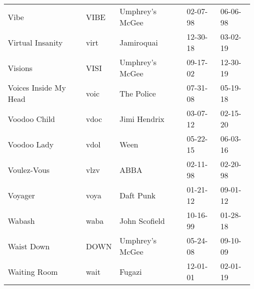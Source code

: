 \begin{longtable}{p{}p{}p{}p{}p{}}
                                                                    Vibe &          VIBE &                                          Umphrey's McGee &              02-07-98 &             06-06-98 \\
                                                        Virtual Insanity &          virt &                                               Jamiroquai &              12-30-18 &             03-02-19 \\
                                                                 Visions &          VISI &                                          Umphrey's McGee &              09-17-02 &             12-30-19 \\
                                                   Voices Inside My Head &          voic &                                               The Police &              07-31-08 &             05-19-18 \\
                                                            Voodoo Child &          vdoc &                                             Jimi Hendrix &              03-07-12 &             02-15-20 \\
                                                             Voodoo Lady &          vdol &                                                     Ween &              05-22-15 &             06-03-16 \\
                                                             Voulez-Vous &          vlzv &                                                     ABBA &              02-11-98 &             02-20-98 \\
                                                                 Voyager &          voya &                                                Daft Punk &              01-21-12 &             09-01-12 \\
                                                                  Wabash &          waba &                                            John Scofield &              10-16-99 &             01-28-18 \\
                                                              Waist Down &          DOWN &                                          Umphrey's McGee &              05-24-08 &             09-10-09 \\
                                                            Waiting Room &          wait &                                                   Fugazi &              12-01-01 &             02-01-19 \\

\end{longtable}
